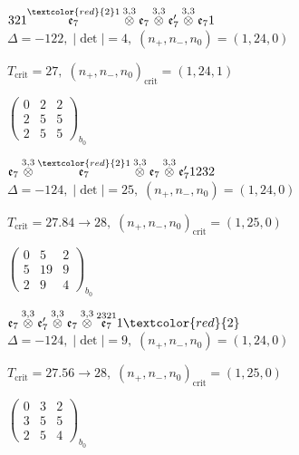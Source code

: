 \documentclass[10pt]{article}
\begin{document}
$321\overset{\textcolor{red}{2}1}{\mathfrak{e}_7}\overset{3,3}{\otimes}\mathfrak{e}_7\overset{3,3}{\otimes}\mathfrak{e}_7'\overset{3,3}{\otimes}\mathfrak{e}_71$ \quad $\Delta=-122,\; |\det|=4,\; (n_+,n_-,n_0)=(1,24,0)$

\hspace{1em}$T_{\text{crit}}=27,\; (n_+,n_-,n_0)_{\text{crit}}=(1,24,1)$

\hspace{2em}$\left(\begin{smallmatrix}0 & 2 & 2 \\ 2 & 5 & 5 \\ 2 & 5 & 5\end{smallmatrix}\right)_{\!b_0}$

\smallskip

$\mathfrak{e}_7\overset{3,3}{\otimes}\overset{\textcolor{red}{2}1}{\mathfrak{e}_7}\overset{3,3}{\otimes}\mathfrak{e}_7\overset{3,3}{\otimes}\mathfrak{e}_7'1232$ \quad $\Delta=-124,\; |\det|=25,\; (n_+,n_-,n_0)=(1,24,0)$

\hspace{1em}$T_{\text{crit}}=27.84 \to 28,\; (n_+,n_-,n_0)_{\text{crit}}=(1,25,0)$

\hspace{2em}$\left(\begin{smallmatrix}0 & 5 & 2 \\ 5 & 19 & 9 \\ 2 & 9 & 4\end{smallmatrix}\right)_{\!b_0}$

\smallskip

$\mathfrak{e}_7\overset{3,3}{\otimes}\mathfrak{e}_7'\overset{3,3}{\otimes}\mathfrak{e}_7\overset{3,3}{\otimes}\overset{2321}{\mathfrak{e}_7}1\textcolor{red}{2}$ \quad $\Delta=-124,\; |\det|=9,\; (n_+,n_-,n_0)=(1,24,0)$

\hspace{1em}$T_{\text{crit}}=27.56 \to 28,\; (n_+,n_-,n_0)_{\text{crit}}=(1,25,0)$

\hspace{2em}$\left(\begin{smallmatrix}0 & 3 & 2 \\ 3 & 5 & 5 \\ 2 & 5 & 4\end{smallmatrix}\right)_{\!b_0}$
\end{document}
